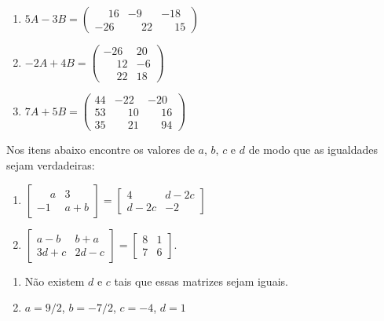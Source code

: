 \documentclass[12pt]{exam}
\begin{document}
\begin{exercicio}
\begin{solucao}
\begin{enumerate}[label={\alph*})]
            \item $5A - 3B = \begin{pmatrix}\phantom{-} 16 & -9 & -18\\-26 & \phantom{-} 22 & \phantom{-} 15\end{pmatrix}$
            \item $-2A + 4B = \begin{pmatrix}-26 & 20\\\phantom{-} 12 & -6\\\phantom{-} 22 & 18\end{pmatrix}$
            \item $7A + 5B = \begin{pmatrix}44 & -22 & -20\\53 & \phantom{-} 10 &\phantom{-} 16\\35 &\phantom{-} 21 & \phantom{-} 94\end{pmatrix}$
        \end{enumerate}
    \end{solucao}
\end{exercicio}

\begin{exercicio}
    \label{igualdade_de_matrizes} Nos itens abaixo encontre os valores de $a$, $b$, $c$ e $d$ de modo que as igualdades sejam verdadeiras:
    \begin{enumerate}[label={\alph*})]
        \item $\begin{bmatrix}\phantom{-} a & 3\\-1 & a + b\end{bmatrix} = \begin{bmatrix}4 & d - 2c\\d - 2c & -2\end{bmatrix}$
        \item $\begin{bmatrix}a - b & b + a\\3d + c & 2d - c\end{bmatrix} = \begin{bmatrix}8 & 1\\7 & 6\end{bmatrix}$.
    \end{enumerate}
    \begin{solucao}
        \begin{enumerate}
            \item Não existem $d$ e $c$ tais que essas matrizes sejam iguais.
            \item $a = 9/2$, $b = -7/2$, $c = -4$, $d = 1$
        \end{enumerate}
    \end{solucao}
\end{exercicio}
\end{document}
